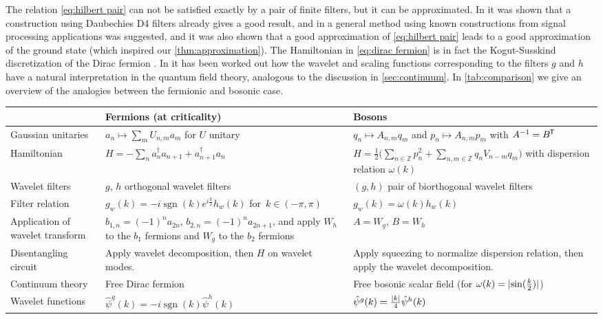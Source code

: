 \documentclass[submission, Phys]{SciPost}
\theoremstyle{definition}
\theoremstyle{remark}
\DeclareMathOperator{\sgn}{sgn}
\DeclarePairedDelimiter{\abs}{\lvert}{\rvert}
\newcommand{\ZZ}{\mathbb Z}
\newcommand*{\tran}{{\mkern-1.5mu\mathsf{T}}}
\begin{document}
\begin{appendix}
{The relation \cref{eq:hilbert pair} can not be satisfied exactly by a pair of finite filters, but it can be approximated.
In \cite{evenbly2016entanglement} it was shown that a construction using Daubechies D4 filters already gives a good result, and in \cite{haegeman2018rigorous} a general method using known constructions from signal processing applications \cite{selesnick2002design} was suggested, and it was also shown that a good approximation of \cref{eq:hilbert pair} leads to a good approximation of the ground state (which inspired our \cref{thm:approximation}).
The Hamiltonian in \cref{eq:dirac fermion} is in fact the Kogut-Susskind discretization of the Dirac fermion \cite{kogut1975hamiltonian}.
In \cite{witteveen2019quantum} it has been worked out how the wavelet and scaling functions corresponding to the filters $g$ and $h$ have a natural interpretation in the quantum field theory, analogous to the discussion in \cref{sec:continuum}.
In \cref{tab:comparison} we give an overview of the analogies between the fermionic and bosonic case.

\begin{table}
  \begin{footnotesize}
\begin{tabular}{p{2.6cm}|p{5.5cm}|p{5.5cm}}
   & Fermions (at criticality) \cite{evenbly2016entanglement,haegeman2018rigorous} & Bosons \\
  \hline\hline
  Gaussian unitaries & $a_n \mapsto \sum_{m} U_{n,m}a_m$ for $U$ unitary & $q_n \mapsto A_{n,m} q_m$ and $p_n \mapsto A_{n,m} p_m$ with $A^{-1} = B^\tran$ \\
  \hline
  Hamiltonian & $H = -\sum_n a_n^\dagger a_{n+1} + a_{n+1}^\dagger a_n$ & $H = \frac12\bigl(\sum_{n \in \ZZ} p_n^2 + \sum_{n, m \in \ZZ} q_n V_{n - m} q_m\bigr)$ with dispersion relation $\omega(k)$ \\
  \hline
  Wavelet filters & $g$, $h$ orthogonal wavelet filters & $(g,h)$ pair of biorthogonal wavelet filters \\
  \hline
  Filter relation & $g_w(k) = -i\sgn(k)e^{i\frac{k}{2}}h_w(k)$ for~$k \in (-\pi,\pi)$ & $g_w(k) = \omega(k)h_w(k)$ \\
  \hline
  Application of wavelet transform & $b_{1,n} = (-1)^n a_{2n}$, $b_{2,n} = (-1)^n a_{2n+1}$, and apply $W_h$ to the $b_1$ fermions and $W_g$ to the $b_2$ fermions & $A = W_g$, $B = W_h$ \\
  \hline
  Disentangling circuit & Apply wavelet decomposition, then $H$ on wavelet modes. & Apply squeezing to normalize dispersion relation, then apply the wavelet decomposition. \\
  \hline
  Continuum theory & Free Dirac fermion & Free bosonic scalar field (for $\omega(k)=\abs{\sin(\frac{k}{2})}$) \\
  \hline
  Wavelet functions & $\hat{\psi}^g(k) = -i\sgn(k)\hat{\psi}^h(k)$ & $\hat{\psi}^g(k) = \frac{\abs{k}}{4}\hat{\psi}^h(k)$
\end{tabular}
\end{footnotesize}


\end{table}}
\end{appendix}
\end{document}
